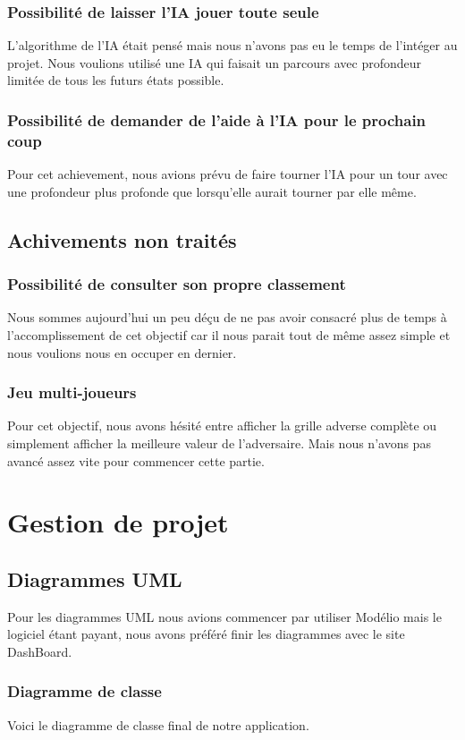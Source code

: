 \documentclass[a4paper,10pt]{report}
\begin{document}
    \section{Possibilité de laisser l'IA jouer toute seule}
      L'algorithme de l'IA était pensé mais nous n'avons pas eu le temps de l'intéger au projet. Nous voulions utilisé une IA qui faisait un parcours avec profondeur
      limitée de tous les futurs états possible.
    \section{Possibilité de demander de l'aide à l'IA pour le prochain coup}
      Pour cet achievement, nous avions prévu de faire tourner l'IA pour un tour avec une profondeur plus profonde que lorsqu'elle aurait tourner par elle même.
  \chapter{Achivements non traités}
    \section{Possibilité de consulter son propre classement}
      Nous sommes aujourd'hui un peu déçu de ne pas avoir consacré plus de temps à l'accomplissement de cet objectif car il nous parait tout de même assez simple et nous voulions nous en occuper en dernier.
    \section{Jeu multi-joueurs}
      Pour cet objectif, nous avons hésité entre afficher la grille adverse complète ou simplement afficher la meilleure valeur de l'adversaire. Mais nous n'avons pas avancé assez vite pour 
      commencer cette partie.
\part{Gestion de projet}
  \chapter{Diagrammes UML}
    Pour les diagrammes UML nous avions commencer par utiliser Modélio mais le logiciel étant payant, nous avons préféré finir les diagrammes avec le site DashBoard. 
    \section{Diagramme de classe}
      Voici le diagramme de classe final de notre application.
\end{document}
